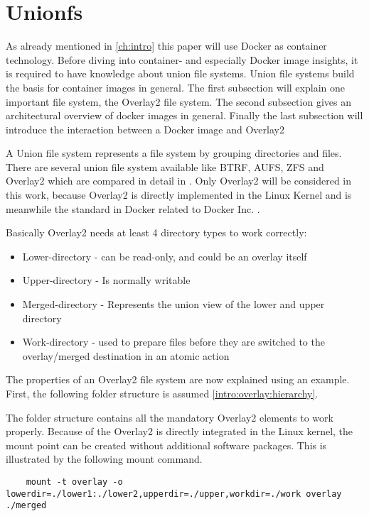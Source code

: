 \section{Unionfs}
\label{sec:intro:docker_image:unionfs}
As already mentioned in \ref{ch:intro} this paper will use Docker as container technology.
Before diving into container- and especially Docker image insights, it is required to have knowledge about union file systems.
Union file systems build the basis for container images in general. The first subsection will explain one important file system, the Overlay2 file system.
The second subsection gives an architectural overview of docker images in general. 
Finally the last subsection will introduce the interaction between a Docker image and Overlay2

A Union file system represents a file system by grouping directories and files. There are several union file system available like BTRF, AUFS, ZFS and Overlay2 which are compared in detail in \cite{Tarasov2019}.
Only Overlay2 will be considered in this work, because Overlay2 is directly implemented in the Linux Kernel \cite{Tarasov2019} and is meanwhile the standard in Docker related to Docker Inc. \cite{docker_storage_driver}.

Basically Overlay2 needs at least 4 directory types to work correctly:
\begin{itemize}
\item Lower-directory - can be read-only, and could be an overlay itself
\item Upper-directory - Is normally writable
\item Merged-directory - Represents the union view of the lower and upper directory
\item Work-directory - used to prepare files before they are switched to the overlay/merged destination in an atomic action 
\end{itemize}

The properties of an Overlay2 file system are now explained using an example. First, the following folder structure is assumed \ref{intro:overlay:hierarchy}.


The folder structure contains all the mandatory Overlay2 elements to work properly. Because of the Overlay2 is directly integrated in the Linux kernel, the mount point can be created without additional software packages.
This is illustrated by the following mount command.
\begin{lstlisting}
	mount -t overlay -o lowerdir=./lower1:./lower2,upperdir=./upper,workdir=./work overlay ./merged
\end{lstlisting}

